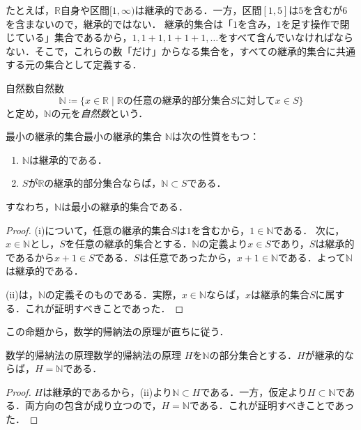 たとえば，$\mathbb{R}$自身や区間$[1, \infty)$は継承的である．一方，区間$[1, 5]$は$5$を含むが$6$を含まないので，継承的ではない．
継承的集合は「$1$を含み，$1$を足す操作で閉じている」集合であるから，$1, 1 + 1, 1 + 1 + 1, \ldots$をすべて含んでいなければならない．そこで，これらの数「だけ」からなる集合を，すべての継承的集合に共通する元の集合として定義する．

\begin{definition}{自然数}{自然数}
  \[
    \mathbb{N} \coloneqq \{ x \in \mathbb{R} \mid \text{$\mathbb{R}$の任意の継承的部分集合$S$に対して$x \in S$} \}
  \]
  と定め，$\mathbb{N}$の元を\emph{自然数}という．
\end{definition}

\begin{prop}{最小の継承的集合}{最小の継承的集合}
  $\mathbb{N}$は次の性質をもつ：
  \begin{enumerate}[label=(\roman*),leftmargin=3.2em]
    \item $\mathbb{N}$は継承的である．
    \item $S$が$\mathbb{R}$の継承的部分集合ならば，$\mathbb{N} \subset S$である．
  \end{enumerate}
  すなわち，$\mathbb{N}$は最小の継承的集合である．
\end{prop}

\begin{tleftbar}
  \begin{proof}
    (i)について，任意の継承的集合$S$は$1$を含むから，$1 \in \mathbb{N}$である．
    次に，$x \in \mathbb{N}$とし，$S$を任意の継承的集合とする．$\mathbb{N}$の定義より$x \in S$であり，$S$は継承的であるから$x + 1 \in S$である．$S$は任意であったから，$x + 1 \in \mathbb{N}$である．よって$\mathbb{N}$は継承的である．

    (ii)は，$\mathbb{N}$の定義そのものである．実際，$x \in \mathbb{N}$ならば，$x$は継承的集合$S$に属する．これが証明すべきことであった．
  \end{proof}
\end{tleftbar}

この命題から，数学的帰納法の原理が直ちに従う．

\begin{theorem}{数学的帰納法の原理}{数学的帰納法の原理}
  $H$を$\mathbb{N}$の部分集合とする．$H$が継承的ならば，$H = \mathbb{N}$である．
\end{theorem}

\begin{tleftbar}
  \begin{proof}
    $H$は継承的であるから，(ii)より$\mathbb{N} \subset H$である．一方，仮定より$H \subset \mathbb{N}$である．両方向の包含が成り立つので，$H = \mathbb{N}$である．これが証明すべきことであった．
  \end{proof}
\end{tleftbar}

